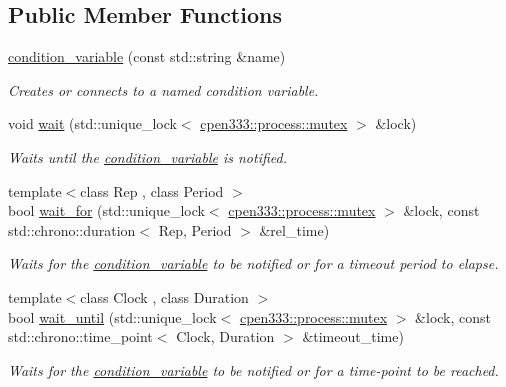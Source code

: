 \subsection*{Public Member Functions}
\begin{DoxyCompactItemize}
\item 
\hyperlink{classcpen333_1_1process_1_1condition__variable_a7f43a5fdf856a56f1e992117fc4e45c3}{condition\+\_\+variable} (const std\+::string \&name)
\begin{DoxyCompactList}\small\item\em Creates or connects to a named condition variable. \end{DoxyCompactList}\item 
void \hyperlink{classcpen333_1_1process_1_1condition__variable_ae5b7ef264d9618986be69d5c0c488925}{wait} (std\+::unique\+\_\+lock$<$ \hyperlink{classcpen333_1_1process_1_1mutex}{cpen333\+::process\+::mutex} $>$ \&lock)
\begin{DoxyCompactList}\small\item\em Waits until the \hyperlink{classcpen333_1_1process_1_1condition__variable}{condition\+\_\+variable} is notified. \end{DoxyCompactList}\item 
{\footnotesize template$<$class Rep , class Period $>$ }\\bool \hyperlink{classcpen333_1_1process_1_1condition__variable_a9cbaf88e2c000a78be14536cbaff9bf8}{wait\+\_\+for} (std\+::unique\+\_\+lock$<$ \hyperlink{classcpen333_1_1process_1_1mutex}{cpen333\+::process\+::mutex} $>$ \&lock, const std\+::chrono\+::duration$<$ Rep, Period $>$ \&rel\+\_\+time)
\begin{DoxyCompactList}\small\item\em Waits for the \hyperlink{classcpen333_1_1process_1_1condition__variable}{condition\+\_\+variable} to be notified or for a timeout period to elapse. \end{DoxyCompactList}\item 
{\footnotesize template$<$class Clock , class Duration $>$ }\\bool \hyperlink{classcpen333_1_1process_1_1condition__variable_a20affb59c611bd2577e940ba5193d801}{wait\+\_\+until} (std\+::unique\+\_\+lock$<$ \hyperlink{classcpen333_1_1process_1_1mutex}{cpen333\+::process\+::mutex} $>$ \&lock, const std\+::chrono\+::time\+\_\+point$<$ Clock, Duration $>$ \&timeout\+\_\+time)
\begin{DoxyCompactList}\small\item\em Waits for the \hyperlink{classcpen333_1_1process_1_1condition__variable}{condition\+\_\+variable} to be notified or for a time-\/point to be reached. \end{DoxyCompactList}\item 

\end{DoxyCompactItemize}
